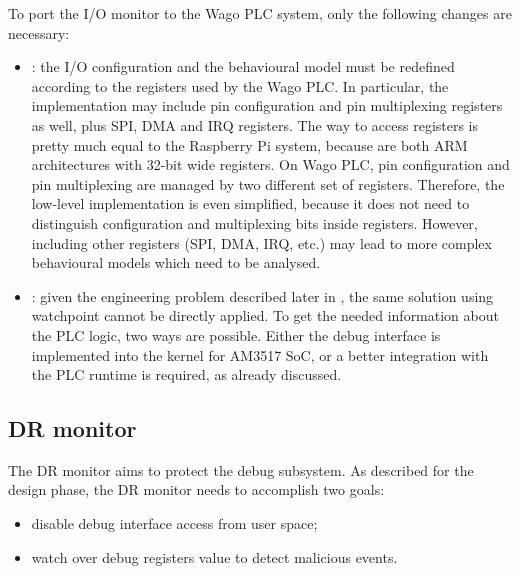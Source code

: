 To port the I/O monitor to the Wago PLC system, only the following changes are necessary:
\begin{itemize}
	\item {}: the I/O configuration and the behavioural model must be redefined according to the registers used by the Wago PLC.
		In particular, the implementation may include pin configuration and pin multiplexing registers as well, plus SPI, DMA and IRQ registers.
		The way to access registers is pretty much equal to the Raspberry Pi system, because are both ARM architectures with 32-bit wide registers.
		On Wago PLC, pin configuration and pin multiplexing are managed by two different set of registers. Therefore, the low-level implementation
		is even simplified, because it does not need to distinguish configuration and multiplexing bits inside registers.
		However, including other registers (\eg SPI, DMA, IRQ, etc.) may lead to more complex behavioural models which need to be analysed.
	\item {}: given the engineering problem described later in , the same solution using watchpoint cannot be directly applied.
		To get the needed information about the PLC logic, two ways are possible. Either the debug interface is implemented into the kernel for AM3517 SoC,
		or a better integration with the PLC runtime is required, as already discussed.
\end{itemize}


\subsection{DR monitor}
\label{sec:dr_impl}

The DR monitor aims to protect the debug subsystem. As described for the design phase, the DR monitor needs to accomplish two goals:
\begin{itemize}
	\item disable debug interface access from user space;
	\item watch over debug registers value to detect malicious events.
\end{itemize}

